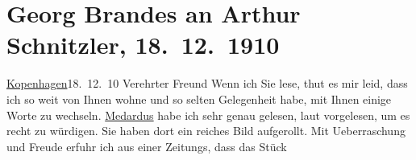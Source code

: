 

         
         \renewcommand{\erwaehntePersonen}{Personen: Richard Beer-Hofmann, Johann Wolfgang von Goethe, Heinrich von Kleist}
         \renewcommand{\erwaehnteOrte}{Orte: Deutschland, Kopenhagen, Wien}
         \renewcommand{\erwaehnteWerke}{Werke: Der junge Medardus. Dramatische Historie in einem Vorspiel und fünf Aufzügen, Tagebücher}
               \section[Georg Brandes an Arthur Schnitzler, 18. 12. 1910]{ Georg Brandes an Arthur Schnitzler, 18. 12. 1910}\nopagebreak{}\rehead{ }\begin{ledgroupsized}[t]{13cm}\normalsize\beginnumbering \toendnotes[C]{\smallbreak\pagebreak[2]} 
\toendnotes[C]{\smallbreak}\pstart
           \raggedleft{}{\pb}\uline{Kopenhagen}18. 12. 10\pend
           \pstart{}Verehrter Freund\pend\pstart
           Wenn ich Sie lese, thut es mir leid, dass ich so weit von Ihnen wohne und so
                    selten Gelegenheit habe, mit Ihnen einige Worte zu wechseln.\pend
           \pstart
           \uline{Medardus} habe ich sehr genau gelesen, laut vorgelesen, um es recht zu würdigen. Sie
                    haben dort ein reiches Bild aufgerollt. Mit Ueberraschung und Freude erfuhr ich
                    aus einer Zeitungs\label{K_L01991_1v}\label{K_L01991_1h}, dass das Stück

\end{ledgroupsized}
